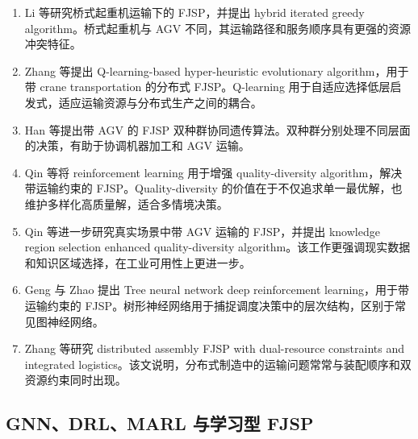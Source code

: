 \documentclass[UTF8,a4paper,11pt]{ctexart}
\begin{document}
\begin{enumerate}[label=\textbf{T\arabic*.},leftmargin=3em]
\item Li 等研究桥式起重机运输下的 FJSP，并提出 hybrid iterated greedy algorithm\cite{Li2022Crane}。桥式起重机与 AGV 不同，其运输路径和服务顺序具有更强的资源冲突特征。

\item Zhang 等提出 Q-learning-based hyper-heuristic evolutionary algorithm，用于带 crane transportation 的分布式 FJSP\cite{Zhang2023CraneQL}。Q-learning 用于自适应选择低层启发式，适应运输资源与分布式生产之间的耦合。

\item Han 等提出带 AGV 的 FJSP 双种群协同遗传算法\cite{Han2024AGV}。双种群分别处理不同层面的决策，有助于协调机器加工和 AGV 运输。

\item Qin 等将 reinforcement learning 用于增强 quality-diversity algorithm，解决带运输约束的 FJSP\cite{Qin2025QD}。Quality-diversity 的价值在于不仅追求单一最优解，也维护多样化高质量解，适合多情境决策。

\item Qin 等进一步研究真实场景中带 AGV 运输的 FJSP，并提出 knowledge region selection enhanced quality-diversity algorithm\cite{Qin2026QDReal}。该工作更强调现实数据和知识区域选择，在工业可用性上更进一步。

\item Geng 与 Zhao 提出 Tree neural network deep reinforcement learning，用于带运输约束的 FJSP\cite{Geng2025TreeDRL}。树形神经网络用于捕捉调度决策中的层次结构，区别于常见图神经网络。

\item Zhang 等研究 distributed assembly FJSP with dual-resource constraints and integrated logistics\cite{Zhang2025DAFJSP}。该文说明，分布式制造中的运输问题常常与装配顺序和双资源约束同时出现。
\end{enumerate}

\subsection{GNN、DRL、MARL 与学习型 FJSP}
\end{document}
